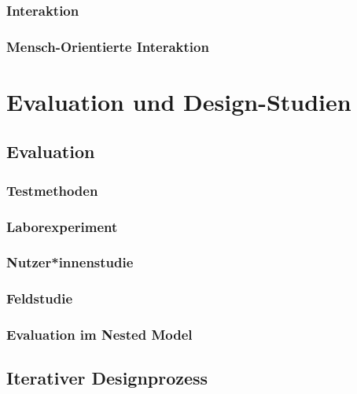 			\subsubsection{Interaktion} %

			\subsubsection{Mensch-Orientierte Interaktion} %

	\section{Evaluation und Design-Studien} %

		\subsection{Evaluation} %

			\subsubsection{Testmethoden} %

			\subsubsection{Laborexperiment} %

			\subsubsection{Nutzer*innenstudie} %

			\subsubsection{Feldstudie} %

			\subsubsection{Evaluation im Nested Model} %

		\subsection{Iterativer Designprozess} %
